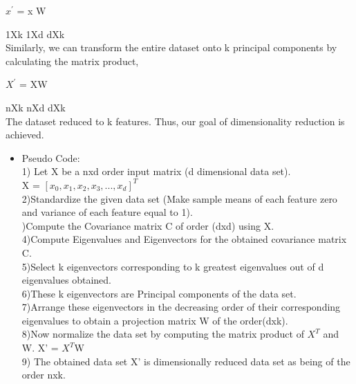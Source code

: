 \documentclass{article}
\begin{document}
\begin{itemize}
\begin{itemize}
        $x^{'}$ = x W
        
        1Xk 1Xd dXk
        \\Similarly, we can transform the entire dataset onto k principal components by calculating the matrix product,
        
        $X^{'}$ = XW
        
        nXk nXd dXk
        \\The dataset reduced to k features. Thus, our goal of dimensionality reduction is achieved.
    \end{itemize}
    
    \begin{itemize}
        \item Pseudo Code: 
        \\1) Let X be a nxd order input matrix (d dimensional data set).
        \\X = $[x_0, x_1, x_2, x_3, ..., x_d]^T$ 
        \\2)Standardize the given data set (Make sample means of each feature zero and variance of each feature equal to 1).
        \\)Compute the Covariance matrix C of order (dxd) using X.
        \\4)Compute Eigenvalues and Eigenvectors for the obtained covariance matrix C.
        \\5)Select k eigenvectors corresponding to k greatest eigenvalues out of d eigenvalues obtained.
        \\6)These k eigenvectors are Principal components of the data set.
        \\7)Arrange these eigenvectors in the decreasing order of their corresponding eigenvalues to obtain a projection matrix W of the order(dxk).
        \\8)Now normalize the data set by computing the matrix product of $X^T$ and W.   
        X’ = $X^T$W
        \\9) The obtained data set X’ is dimensionally reduced data set as being of the order nxk.   

    \end{itemize}
    



\end{itemize}
\end{document}
